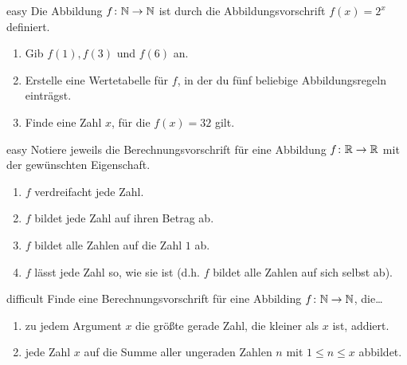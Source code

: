 \documentclass[../abbildungen.tex]{subfiles}
\begin{document}
\begin{exercise}{easy}
    Die Abbildung $f\colon\mathbb{N}\rightarrow\mathbb{N}$ ist durch die Abbildungsvorschrift $f(x)=2^x$ definiert.
    \begin{enumerate}
        \item Gib $f(1), f(3)$ und $f(6)$ an.
        \item Erstelle eine Wertetabelle für $f$, in der du fünf beliebige Abbildungsregeln einträgst.
        \item Finde eine Zahl $x$, für die $f(x)=32$ gilt.
    \end{enumerate}
\end{exercise}
\begin{exercise}{easy}
    Notiere jeweils die Berechnungsvorschrift für eine Abbildung $f\colon\mathbb{R}\rightarrow\mathbb{R}$ mit der gewünschten Eigenschaft.
    \begin{enumerate}
        \item $f$ verdreifacht jede Zahl.
        \item $f$ bildet jede Zahl auf ihren Betrag ab.
        \item $f$ bildet alle Zahlen auf die Zahl $1$ ab.
        \item $f$ lässt jede Zahl so, wie sie ist (d.h. $f$ bildet alle Zahlen auf sich selbst ab).
    \end{enumerate}
\end{exercise}
\begin{exercise}{difficult}
    Finde eine Berechnungsvorschrift für eine Abbilding $f\colon\mathbb{N}\rightarrow\mathbb{N}$, die\dots
    \begin{enumerate}
        \item zu jedem Argument $x$ die größte gerade Zahl, die kleiner als $x$ ist, addiert.
        \item jede Zahl $x$ auf die Summe aller ungeraden Zahlen $n$ mit $1\leq n\leq x$ abbildet.
    \end{enumerate}
\end{exercise}
\end{document}
